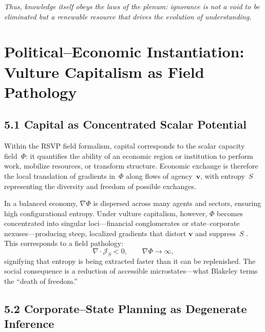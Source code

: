 \documentclass[11pt,a4paper,titlepage]{article}
\theoremstyle{definition}
\begin{document}
\bigskip
\noindent
\textit{Thus, knowledge itself obeys the laws of the plenum:
ignorance is not a void to be eliminated but a renewable resource
that drives the evolution of understanding.}

\section{Political–Economic Instantiation: Vulture Capitalism as Field Pathology}
\label{sec:vulture}

\subsection{5.1 Capital as Concentrated Scalar Potential}

Within the RSVP field formalism, capital corresponds to the scalar capacity
field~$\Phi$: it quantifies the ability of an economic region or institution to
perform work, mobilize resources, or transform structure.
Economic exchange is therefore the local translation of gradients in~$\Phi$
along flows of agency~$\mathbf{v}$, with entropy~$S$ representing the diversity
and freedom of possible exchanges.

In a balanced economy, $\nabla\Phi$ is dispersed across many agents and sectors,
ensuring high configurational entropy.
Under vulture capitalism, however, $\Phi$ becomes concentrated into singular
loci—financial conglomerates or state–corporate nexuses—producing steep,
localized gradients that distort $\mathbf{v}$ and suppress~$S$
\cite{blakeley2024,keen2011,minsky1986}.
This corresponds to a field pathology:
\begin{equation}
\nabla\!\cdot\mathcal{J}_S < 0, 
\qquad
\nabla\Phi \rightarrow \infty,
\label{eq:entropy_collapse}
\end{equation}
signifying that entropy is being extracted faster than it can be replenished.
The social consequence is a reduction of accessible microstates—what
Blakeley terms the ``death of freedom.''

\subsection{5.2 Corporate–State Planning as Degenerate Inference}
\end{document}
